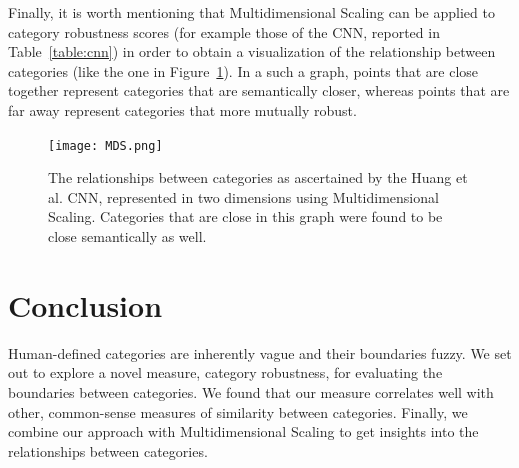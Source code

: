 \documentclass[letterpaper, 12 pt, conference]{ieeeconf}
\begin{document}
Finally, it is worth mentioning that Multidimensional Scaling\cite{mds} can be applied to category robustness scores (for example those of the CNN, reported in Table~\ref{table:cnn}) in order to obtain a visualization of the relationship between categories (like the one in Figure~\ref{fig:mds}). In a such a graph, points that are close together represent categories that are semantically closer, whereas points that are far away represent categories that more mutually robust.

\begin{figure}
    \centering
    \texttt{[image: MDS.png]}
    \caption{The relationships between categories as ascertained by the Huang et al. \cite{huang:aim:2018} CNN, represented in two dimensions using Multidimensional Scaling. Categories that are close in this graph were found to be close semantically as well.}
    \label{fig:mds}
\end{figure}


\section{Conclusion}
Human-defined categories are inherently vague and their boundaries fuzzy. We set out to explore a novel measure, category robustness, for evaluating the boundaries between categories. We found that our measure correlates well with other, common-sense measures of similarity between categories. Finally, we combine our approach with Multidimensional Scaling to get insights into the relationships between categories.

                                 
                                 
                                 
                                 
                                 


\printbibliography
\end{document}
